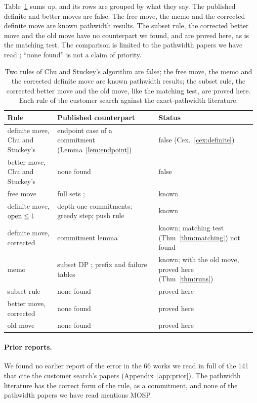 Table~\ref{tab:known} sums up, and its rows are grouped by what they say. The
published definite and better moves are false. The free move, the memo and
the corrected definite move are known pathwidth results. The subset rule, the corrected
better move and the old move have no counterpart we found, and are proved
here, as is the matching test. The comparison is limited to the pathwidth
papers we have read
\citep{SuchanVillanger2009,Bodlaender2012,CoudertMazauricNisse2014,CoudertMazauricNisse2016,KobayashiKomuroTamaki2014,Kitsunai2016};
``none found'' is not a claim of priority.

\begin{table}[t]
\centering\small
\caption{Two rules of Chu and Stuckey's algorithm are false; the free move, the memo and the
corrected definite move are known pathwidth results; the subset rule, the
corrected better move and the old move, like the matching test, are proved here.
Each rule of the customer search against the exact-pathwidth literature.}
\label{tab:known}
\begin{tabularx}{\linewidth}{@{}>{\raggedright}p{3.2cm}>{\raggedright}X>{\raggedright\arraybackslash}p{4.1cm}@{}}
\toprule
Rule & Published counterpart & Status \\
\midrule
definite move, Chu and Stuckey's & endpoint case of a commitment (Lemma~\ref{lem:endpoint}) & false (Cex.~\ref{cex:definite}) \\
better move, Chu and Stuckey's & none found & false \\
\midrule
free move & full sets \citep{SuchanVillanger2009}; \citet[Prop.~3]{Kitsunai2016} & known \\
definite move, $\mathrm{open}\le1$ & depth-one commitments; greedy step; push rule & known \\
definite move, corrected & commitment lemma \citep[Lemma~1]{Kitsunai2016} & known; matching test (Thm~\ref{thm:matching}) not found \\
memo & subset DP \citep{Bodlaender2012}; prefix and failure tables & known; with the old move, proved here (Thm~\ref{thm:runs}) \\
\midrule
subset rule & none found & proved here \\
better move, corrected & none found & proved here \\
old move & none found & proved here \\
\bottomrule
\end{tabularx}
\end{table}

\paragraph{Prior reports.} We found no earlier report of the error in the 66
works we read in full of the 141 that cite the customer search's papers
(Appendix~\ref{app:prior}). The pathwidth literature has the correct form of
the rule, as a commitment, and none of the pathwidth papers we have read mentions
MOSP.

